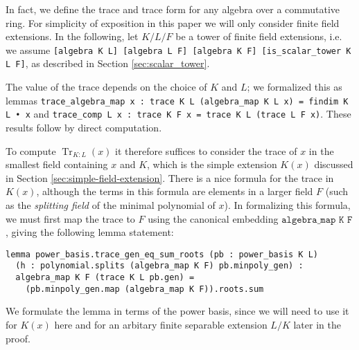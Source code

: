\documentclass[a4paper,USenglish,cleveref, autoref, thm-restate]{lipics-v2021}
\newcommand{\lean}[1]{\texttt{#1}\xspace} %
\DeclareMathOperator{\Tr}{\mathrm{Tr}}
\begin{document}
In fact, we define the trace and trace form for any algebra over a commutative ring.
For simplicity of exposition in this paper we will only consider finite field extensions. %
In the following, let $K / L / F$ be a tower of finite field extensions,
i.e. we assume \lean{[algebra K L] [algebra L F] [algebra K F] [is\_scalar\_tower K L F]}, as described in Section \ref{sec:scalar_tower}.

The value of the trace depends on the choice of $K$ and $L$;
we formalized this as lemmas \lean{trace\_algebra\_map x : trace K L (algebra\_map K L x) = findim K L • x}
and \lean{trace\_comp L x : trace K F x = trace K L (trace L F x)}.
These results follow by direct computation.

To compute $\Tr_{K : L}(x)$ it therefore suffices to consider the trace of $x$ in the smallest field containing $x$ and $K$, which is the simple extension $K(x)$ discussed in Section \ref{sec:simple-field-extension}.
There is a nice formula for the trace in $K(x)$, although the terms in this formula are elements in a larger field $F$
(such as the \emph{splitting field} of the minimal polynomial of $x$).
In formalizing this formula, we must first map the trace to $F$ using the canonical embedding $\lean{algebra\_map K F}$,
giving the following lemma statement:
\begin{lstlisting}
lemma power_basis.trace_gen_eq_sum_roots (pb : power_basis K L)
  (h : polynomial.splits (algebra_map K F) pb.minpoly_gen) :
  algebra_map K F (trace K L pb.gen) =
    (pb.minpoly_gen.map (algebra_map K F)).roots.sum
\end{lstlisting}
We formulate the lemma in terms of the power basis, since we will need to use it for $K(x)$ here
and for an arbitary finite separable extension $L / K$ later in the proof.
\end{document}
